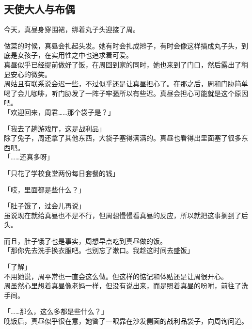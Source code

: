 \subsection{天使大人与布偶}

今天，真昼身穿围裙，绑着丸子头迎接了周。

做菜的时候，真昼会扎起头发。她有时会扎成辫子，有时会像这样搞成丸子头，到底是女孩子，在实用性之中也追求着可爱。\\

真昼似乎已经提前做好了饭，在周回到家的同时，她也来到了门口，然后露出了稍显安心的微笑。\\

周姑且有联系说会迟一些，不过似乎还是让真昼担心了。在那之后，周和门胁简单喝了会儿咖啡，听门胁发了一阵子牢骚所以有些迟。真昼会担心可能就是这个原因吧。\\

「欢迎回来，周君……那个袋子是？」

「我去了趟游戏厅，这是战利品」\\

除了兔子，周还拿了其他东西，大袋子塞得满满的。真昼也看得出里面塞了很多东西吧。\\

「……还真多呀」

「只花了学校食堂两份每日套餐的钱」

「哎，里面都是些什么？」

「肚子饿了，过会儿再说」\\

虽说现在就给真昼也不是不行，但周想慢慢看真昼的反应，所以就把这事搁到了后头。

而且，肚子饿了也是事实，周想早点吃到真昼做的饭。\\

「那你先去洗手换衣服吧。也别忘了漱口。我趁这时间去盛饭」

「了解」\\

不用她说，周平常也一直会这么做。但这样的惦记和体贴还是让周很开心。\\

周虽然心里想着真昼像老妈一样，但没有说出来，而是照着真昼的吩咐，前往了洗手间。\\

\vspace{2\baselineskip}

「……那么，这么多都是些什么？」\\

晚饭后，真昼似乎很在意，她瞥了一眼靠在沙发侧面的战利品袋子，向周询问道。\\

